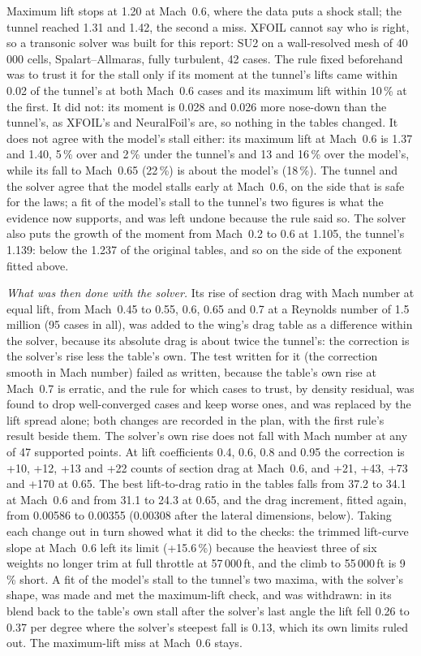 \documentclass[10pt,a4paper,twocolumn]{article}
\begin{document}
Maximum lift stops at 1.20 at Mach~0.6, where the data puts a shock stall; the tunnel reached 1.31 and 1.42, the second a miss. XFOIL cannot say who is
right, so a transonic solver was built for this report: SU2 on a wall-resolved mesh of 40\,000 cells, Spalart--Allmaras, fully turbulent, 42 cases. The rule fixed
beforehand was to trust it for the stall only if its moment at the tunnel's lifts came within 0.02 of the tunnel's at both Mach~0.6 cases and its maximum lift
within 10\,\% at the first. It did not: its moment is 0.028 and 0.026 more nose-down than the tunnel's, as XFOIL's and NeuralFoil's are, so nothing in the tables
changed. It does not agree with the model's stall either: its maximum lift at Mach~0.6 is 1.37 and 1.40, 5\,\% over and 2\,\% under the tunnel's and 13 and 16\,\% over
the model's, while its fall to Mach~0.65 (22\,\%) is about the model's (18\,\%). The tunnel and the solver agree that the model stalls early at Mach~0.6, on the side
that is safe for the laws; a fit of the model's stall to the tunnel's two figures is what the evidence now supports, and was left undone because the rule said so.
The solver also puts the growth of the moment from Mach~0.2 to 0.6 at 1.105, the tunnel's 1.139: below the 1.237 of the original tables, and so on the side of the
exponent fitted above.

\emph{What was then done with the solver.} Its rise of section drag with Mach number at equal lift, from Mach~0.45 to 0.55, 0.6, 0.65 and 0.7 at a Reynolds number of 1.5 million (95 cases in all), was added to the wing's drag table as a difference within the solver, because its absolute drag is about twice the tunnel's: the correction is the solver's rise less the table's own. The test written for it (the correction smooth in Mach number) failed as written, because the table's own rise at Mach~0.7 is erratic, and the rule for which cases to trust, by density residual, was found to drop well-converged cases and keep worse ones, and was replaced by the lift spread alone; both changes are recorded in the plan, with the first rule's result beside them. The solver's own rise does not fall with Mach number at any of 47 supported points. At lift coefficients 0.4, 0.6, 0.8 and 0.95 the correction is +10, +12, +13 and +22 counts of section drag at Mach~0.6, and +21, +43, +73 and +170 at 0.65. The best lift-to-drag ratio in the tables falls from 37.2 to 34.1 at Mach~0.6 and from 31.1 to 24.3 at 0.65, and the drag increment, fitted again, from 0.00586 to 0.00355 (0.00308 after the lateral dimensions, below). Taking each change out in turn showed what it did to the checks: the trimmed lift-curve slope at Mach~0.6 left its limit (+15.6\,\%) because the heaviest three of six weights no longer trim at full throttle at 57\,000\,ft, and the climb to 55\,000\,ft is 9\,\% short. A fit of the model's stall to the tunnel's two maxima, with the solver's shape, was made and met the maximum-lift check, and was withdrawn: in its blend back to the table's own stall after the solver's last angle the lift fell 0.26 to 0.37 per degree where the solver's steepest fall is 0.13, which its own limits ruled out. The maximum-lift miss at Mach~0.6 stays.
\end{document}
